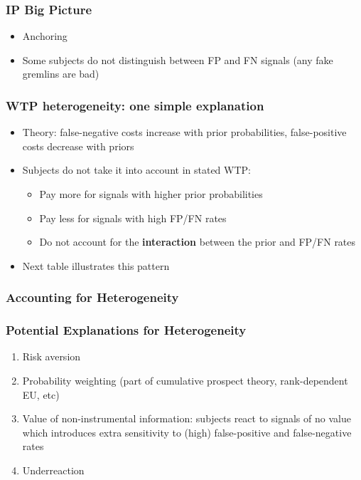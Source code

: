 \documentclass[11pt,hyperref={bookmarks=false}]{beamer}
\begin{document}
\begin{frame}
\frametitle{IP Big Picture}
\begin{itemize}
\item Anchoring
\item Some subjects do not distinguish between FP and FN signals (any fake gremlins are bad)
\end{itemize}
\small

\end{frame}




\begin{frame}
\frametitle{WTP heterogeneity: one simple explanation}
\begin{itemize}
\item Theory: false-negative costs increase with prior probabilities, false-positive costs decrease with priors
\item Subjects do not take it into account in stated WTP:
\begin{itemize}
\item Pay more for signals with higher prior probabilities
\item Pay less for signals with high FP/FN rates
\item Do not account for the \textbf{interaction} between the prior and FP/FN rates
\end{itemize}
\item Next table illustrates this pattern
\end{itemize}
\end{frame}

\begin{frame}
\frametitle{Accounting for Heterogeneity}
\footnotesize

\end{frame}


\begin{frame}
\frametitle{Potential Explanations for Heterogeneity}
\begin{enumerate}
\item Risk aversion
\item Probability weighting (part of cumulative prospect theory, rank-dependent EU, etc)
\item Value of non-instrumental information: subjects react to signals of no value which introduces extra sensitivity to (high) false-positive and false-negative rates
\item Underreaction 
\end{enumerate}
\end{frame}
\end{document}
